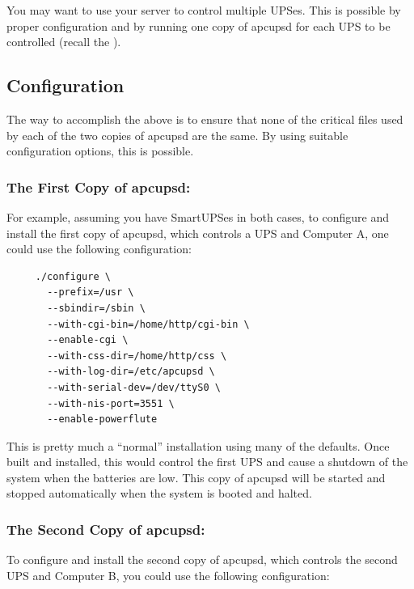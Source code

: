 {{{{{{You may want to use your server to control multiple UPSes. This is possible by
proper configuration and by running one copy of apcupsd for each UPS to be
controlled (recall the 
). 

\label{Configuration}

\subsection*{Configuration}

The way to accomplish the above is to ensure that none of the critical files
used by each of the two copies of apcupsd are the same. By using suitable
configuration options, this is possible. 

\label{The-First-Copy-of-apcupsd}

\subsubsection*{The First Copy of apcupsd:}

For example, assuming you have SmartUPSes in both cases, to configure and
install the first copy of apcupsd, which controls a UPS and Computer A, one
could use the following configuration: 

\footnotesize
\begin{verbatim}
     ./configure \
       --prefix=/usr \
       --sbindir=/sbin \
       --with-cgi-bin=/home/http/cgi-bin \
       --enable-cgi \
       --with-css-dir=/home/http/css \
       --with-log-dir=/etc/apcupsd \
       --with-serial-dev=/dev/ttyS0 \
       --with-nis-port=3551 \
       --enable-powerflute
\end{verbatim}
\normalsize

This is pretty much a ``normal'' installation using many of the defaults. Once
built and installed, this would control the first UPS and cause a shutdown of
the system when the batteries are low.  This copy of apcupsd will be started
and stopped automatically when the system is booted and halted. 

\label{The-Second-Copy-of-apcupsd}

\subsubsection*{The Second Copy of apcupsd:}

\label{index-Two-apcupsds-161}
To configure and install the second copy of apcupsd, which controls the second
UPS and Computer B, you could use the following configuration: 

}}}}}}
